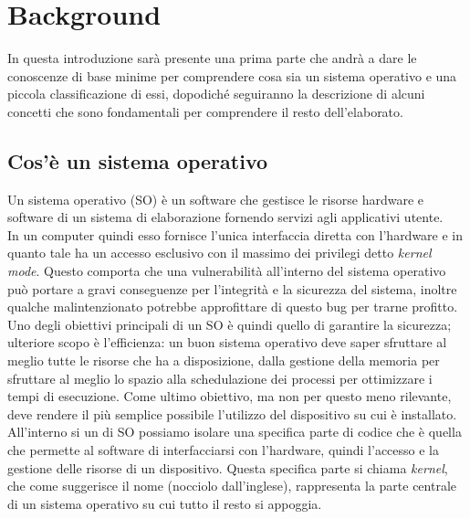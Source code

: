 \chapter{Background}
In questa introduzione sarà presente una prima parte che andrà a dare le conoscenze di base minime per comprendere cosa sia un sistema operativo e una piccola classificazione di essi, dopodiché seguiranno la descrizione di alcuni concetti che sono fondamentali per comprendere il resto dell'elaborato.

\section{Cos'è un sistema operativo}
Un sistema operativo (SO) è un software che gestisce le risorse hardware e software di un sistema di elaborazione fornendo servizi agli applicativi utente.\\
In un computer quindi esso fornisce l'unica interfaccia diretta con l'hardware e in quanto tale ha un accesso esclusivo con il massimo dei privilegi detto \textit{kernel mode}. Questo comporta che una vulnerabilità all'interno del sistema operativo può portare a gravi conseguenze per l'integrità e la sicurezza del sistema, inoltre qualche malintenzionato potrebbe approfittare di questo bug per trarne profitto.
Uno degli obiettivi principali di un SO è quindi quello di garantire la sicurezza; ulteriore scopo è l'efficienza: un buon sistema operativo deve saper sfruttare al meglio tutte le risorse che ha a disposizione, dalla gestione della memoria per sfruttare al meglio lo spazio alla schedulazione dei processi per ottimizzare i tempi di esecuzione. Come ultimo obiettivo, ma non per questo meno rilevante, deve rendere il più semplice possibile l'utilizzo del dispositivo su cui è installato.
All'interno si un di SO possiamo isolare una specifica parte di codice che è quella che permette al software di interfacciarsi con l'hardware, quindi l'accesso e la gestione delle risorse di un dispositivo. Questa specifica parte si chiama \textit{kernel}, che come suggerisce il nome (nocciolo dall'inglese), rappresenta la parte centrale di un sistema operativo su cui tutto il resto si appoggia.
\newpage

